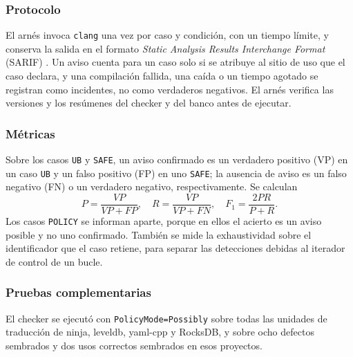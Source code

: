 \documentclass[conference]{IEEEtran}
\newcommand{\code}[1]{\texttt{#1}}
\begin{document}
\subsubsection{Protocolo}
El arnés invoca \code{clang} una vez por caso y condición, con un tiempo límite, y conserva la salida en el formato \textit{Static Analysis Results Interchange Format} (SARIF) \cite{sarif}. Un aviso cuenta para un caso solo si se atribuye al sitio de uso que el caso declara, y una compilación fallida, una caída o un tiempo agotado se registran como incidentes, no como verdaderos negativos. El arnés verifica las versiones y los resúmenes del checker y del banco antes de ejecutar.

\subsubsection{Métricas}
Sobre los casos \code{UB} y \code{SAFE}, un aviso confirmado es un verdadero positivo (VP) en un caso \code{UB} y un falso positivo (FP) en uno \code{SAFE}; la ausencia de aviso es un falso negativo (FN) o un verdadero negativo, respectivamente. Se calculan
\begin{equation}
P=\frac{\mathit{VP}}{\mathit{VP}+\mathit{FP}},\quad R=\frac{\mathit{VP}}{\mathit{VP}+\mathit{FN}},\quad F_1=\frac{2PR}{P+R}.
\label{eq:metricas}
\end{equation}
Los casos \code{POLICY} se informan aparte, porque en ellos el acierto es un aviso posible y no uno confirmado. También se mide la exhaustividad sobre el identificador que el caso retiene, para separar las detecciones debidas al iterador de control de un bucle.

\subsubsection{Pruebas complementarias}
El checker se ejecutó con \code{PolicyMode=Possibly} sobre todas las unidades de traducción de ninja, leveldb, yaml-cpp y RocksDB, y sobre ocho defectos sembrados y dos usos correctos sembrados en esos proyectos.
\end{document}
